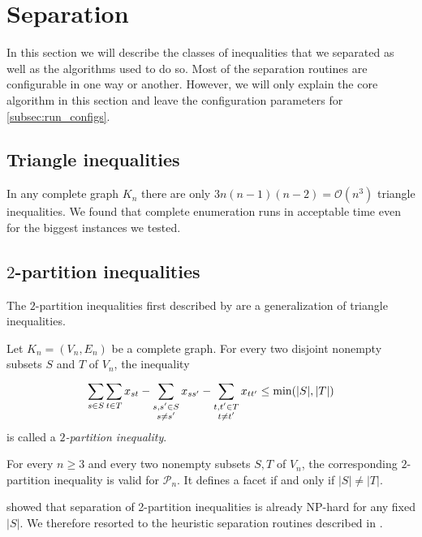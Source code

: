 \section{Separation}\label{sec:separation}
In this section we will describe the classes of inequalities that we separated as well as the algorithms used to do so.
Most of the separation routines are configurable in one way or another.
However, we will only explain the core algorithm in this section and leave the configuration parameters for \cref{subsec:run_configs}.

\subsection{Triangle inequalities}\label{subsec:triangle_separator}
In any complete graph $K_{n}$ there are only $3n(n-1)(n-2) = \mathcal{O}(n^{3})$ triangle inequalities.
We found that complete enumeration runs in acceptable time even for the biggest instances we tested.

\subsection{\texorpdfstring{$2$-partition}{2-partition} inequalities}\label{subsec:two_partition_separator}
The $2$-partition inequalities first described by \cite{grotschelFacetsCliquePartitioning1990} are a generalization of triangle inequalities.
\begin{definition}\label{def:2-partition_inequality}
	Let $K_{n} = (V_{n}, E_{n})$ be a complete graph.
	For every two disjoint nonempty subsets $S$ and $T$ of $V_{n}$, the inequality
	\begin{equation}\label{eq:2-partition_inequality}
		\sum_{s \in S}^{} \sum_{t \in T}^{} x_{st} - \sum_{\substack{s, s' \in S \\ s \neq s'}}^{} x_{ss'} - \sum_{\substack{t, t' \in T \\ t \neq t'}}^{} x_{tt'} \leq \operatorname{\text{min}}( \lvert S \rvert, \lvert T \rvert )
	\end{equation}
	is called a $2$\textit{-partition inequality}.
\end{definition}
\begin{theorem}
	For every $n \geq 3$ and every two nonempty subsets $S, T$ of $V_{n}$, the corresponding $2$-partition inequality is valid for $\mathscr{P}_{n}$.
	It defines a facet if and only if $\lvert  S \rvert \neq \lvert T \rvert$.
\end{theorem}
\cite{oostenCliquePartitioningProblem2001a} showed that separation of 2-partition inequalities is already \textsc{NP}-hard for any fixed $\lvert S \rvert$.
We therefore resorted to the heuristic separation routines described in \cite{grotschelFacetsCliquePartitioning1990}.

